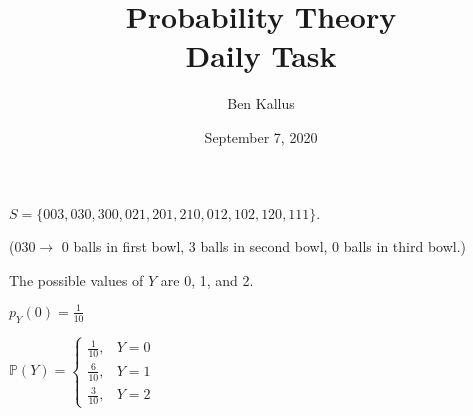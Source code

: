 \documentclass[12pt]{article}
\title{Probability Theory \\ Daily Task}
\author{Ben Kallus}
\date{September 7, 2020}
\begin{document}
\maketitle

    $S = \{003, 030, 300,
           021, 201, 210,
           012, 102, 120,
           111\}$.
           
    ($030 \to$ 0 balls in first bowl, 3 balls in second bowl, 0 balls in third bowl.)

\medskip
{}
    The possible values of $Y$ are 0, 1, and 2.

\medskip
{}
    $p_Y(0) = \frac{1}{10}$

\medskip
{}
    $\mathbb P(Y) = \begin{cases}
        \frac{1}{10}, & Y = 0 \\
        \frac{6}{10}, & Y = 1 \\
        \frac{3}{10}, & Y = 2
    \end{cases}$
\end{document}
